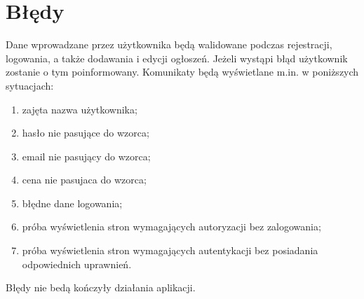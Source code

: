 \documentclass{article}
\begin{document}
\section{Błędy}
{\fontsize{12}{12}\selectfont
    Dane wprowadzane przez użytkownika będą walidowane podczas rejestracji, logowania, a także dodawania i
    edycji ogłoszeń. Jeżeli wystąpi błąd użytkownik zostanie o tym poinformowany. Komunikaty będą wyświetlane m.in. w poniższych sytuacjach:
    
    \begin{enumerate}
        \item zajęta nazwa użytkownika;
        \item hasło nie pasujące do wzorca;
        \item email nie pasujący do wzorca;
        \item cena nie pasujaca do wzorca;
        \item błędne dane logowania;
        \item próba wyświetlenia stron wymagających autoryzacji bez zalogowania;
        \item próba wyświetlenia stron wymagających autentykacji bez posiadania odpowiednich uprawnień.
        
    \end{enumerate}
    
    Błędy nie bedą kończyły działania aplikacji.

}
\end{document}
